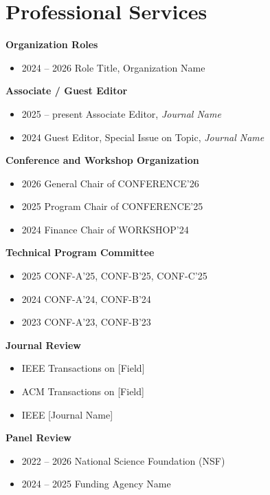 \section{Professional Services}

\noindent\textbf{Organization Roles}
\begin{itemize}
  \item 2024 -- 2026 \quad Role Title, Organization Name
\end{itemize}

\noindent\textbf{Associate / Guest Editor}
\begin{itemize}
  \item 2025 -- present \quad Associate Editor, \textit{Journal Name}
  \item 2024 \quad Guest Editor, Special Issue on Topic, \textit{Journal Name}
\end{itemize}

\noindent\textbf{Conference and Workshop Organization}
\begin{itemize}
  \item 2026 \quad General Chair of CONFERENCE'26
  \item 2025 \quad Program Chair of CONFERENCE'25
  \item 2024 \quad Finance Chair of WORKSHOP'24
\end{itemize}

\noindent\textbf{Technical Program Committee}
\begin{itemize}
  \item 2025 \quad CONF-A'25, CONF-B'25, CONF-C'25
  \item 2024 \quad CONF-A'24, CONF-B'24
  \item 2023 \quad CONF-A'23, CONF-B'23
\end{itemize}

\noindent\textbf{Journal Review}
\begin{itemize}
  \item IEEE Transactions on [Field]
  \item ACM Transactions on [Field]
  \item IEEE [Journal Name]
\end{itemize}

\noindent\textbf{Panel Review}
\begin{itemize}
  \item 2022 -- 2026 \quad National Science Foundation (NSF)
  \item 2024 -- 2025 \quad Funding Agency Name
\end{itemize}

